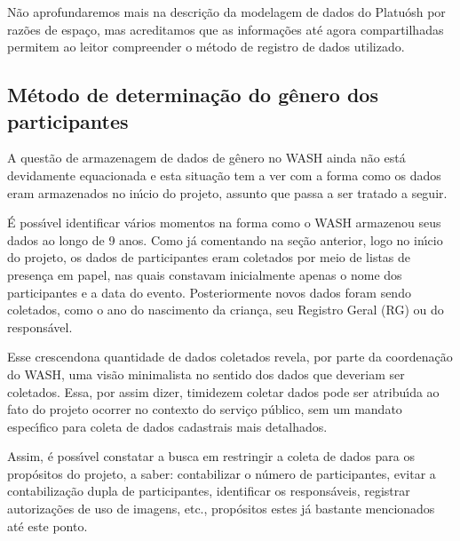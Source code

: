 \documentclass[
12pt,		%
openright,	%
twoside,  %
a4paper,			%
chapter=TITLE,		%
english,			%
french,				%
spanish,			%
brazil				%
]{USPSC-classe/USPSC_RedarTex}
\begin{document}
N\~ao aprofundaremos mais na descri\c{c}\~ao da modelagem de dados do Platu\'osh por raz\~oes de espa\c{c}o, mas acreditamos que as informa\c{c}\~oes at\'e agora compartilhadas permitem ao leitor compreender o m\'etodo de registro de dados utilizado.








\subsection[M\'etodo de determina\c{c}\~ao do g\^enero dos participantes]{M\'etodo de determina\c{c}\~ao do g\^enero dos participantes}\label{M\'etodo de determina\c{c}\~ao do g\^enero dos participantes}
A quest\~ao de armazenagem de dados de g\^enero no WASH ainda n\~ao est\'a devidamente equacionada e esta situa\c{c}\~ao tem a ver com a forma como os dados eram armazenados no in\'{\i}cio do projeto, assunto que passa a ser tratado a seguir.








\'E poss\'{\i}vel identificar v\'arios momentos na forma como o WASH armazenou seus dados ao longo de 9 anos. Como j\'a comentando na se\c{c}\~ao anterior, logo no in\'{\i}cio do projeto, os dados de participantes eram coletados por meio de listas de presen\c{c}a em papel, nas quais constavam inicialmente apenas o nome dos participantes e a data do evento. Posteriormente novos dados foram sendo coletados, como o ano do nascimento da crian\c{c}a, seu Registro Geral (RG) ou do respons\'avel.








Esse \textquotedbl crescendo\textquotedbl  na quantidade de dados coletados revela, por parte da coordena\c{c}\~ao do WASH, uma vis\~ao minimalista no sentido dos dados que deveriam ser coletados. Essa, por assim dizer, \textquotedbl timidez\textquotedbl  em coletar dados pode ser atribu\'{\i}da ao fato do projeto ocorrer no contexto do servi\c{c}o p\'ublico, sem um mandato espec\'{\i}fico para coleta de dados cadastrais mais detalhados.








Assim, \'e poss\'{\i}vel constatar a busca em restringir a coleta de dados para os prop\'ositos do projeto, a saber: contabilizar o n\'umero de participantes, evitar a contabiliza\c{c}\~ao dupla de participantes, identificar os respons\'aveis, registrar autoriza\c{c}\~oes de uso de imagens, etc., prop\'ositos estes j\'a bastante mencionados at\'e este ponto.
\end{document}

